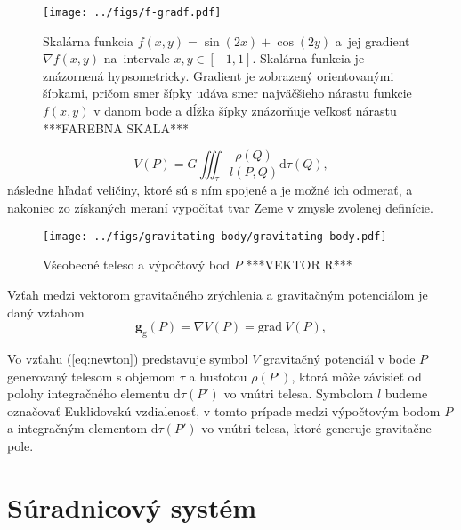 \documentclass[a4paper, 12pt]{book}
\newcommand{\diff}{\mathrm d}
\newcommand{\grad}{\mathrm{grad}}
\newcommand{\gidx}{\mathrm g}
\let\vec\mathbf
\begin{document}


\begin{figure}[bt]
\centering
\texttt{[image: ../figs/f-gradf.pdf]}
\caption{Skalárna funkcia $f(x, y) = \sin(2x) + \cos(2y)$ a~jej gradient 
$\nabla f(x, y)$ na~intervale $x, y \in [-1, 1]$.  Skalárna funkcia je 
znázornená hypsometricky.  Gradient je zobrazený orientovanými šípkami, pričom 
smer šípky udáva smer najväčšieho nárastu funkcie $f(x, y)$ v danom bode 
a dĺžka šípky znázorňuje veľkosť nárastu ***FAREBNA SKALA***}
\label{fig:f_gradf}
\end{figure}


%
\begin{equation}
\label{eq:newton}
V(P) = G \iiint_{\tau} \frac{\rho(Q)}{l(P, Q)} \diff \tau(Q){,}
\end{equation}
%
následne hľadať veličiny, ktoré sú s ním spojené a je možné ich odmerať, 
a nakoniec zo získaných meraní vypočítať tvar Zeme v zmysle zvolenej definície.

\begin{figure}[bt]
\centering
\texttt{[image: ../figs/gravitating-body/gravitating-body.pdf]}
\caption{Všeobecné teleso a výpočtový bod $P$ ***VEKTOR R***}
\end{figure}

Vzťah medzi vektorom gravitačného zrýchlenia a gravitačným potenciálom je daný 
vzťahom
%
\begin{equation}
\vec g_\gidx(P) = \nabla V(P) = \grad \ V(P){,}
\end{equation}
%

Vo vzťahu (\ref{eq:newton}) predstavuje symbol $V$ gravitačný potenciál v bode 
$P$ generovaný telesom s objemom $\tau$ a hustotou $\rho(P')$, ktorá môže 
závisieť od polohy integračného elementu $\diff \tau(P')$ vo vnútri telesa.  
Symbolom $l$ budeme označovať Euklidovskú vzdialenosť, v tomto prípade medzi 
výpočtovým bodom $P$ a integračným elementom $\diff \tau(P')$ vo vnútri telesa, 
ktoré generuje gravitačne pole.







\section{Súradnicový systém}
\end{document}
